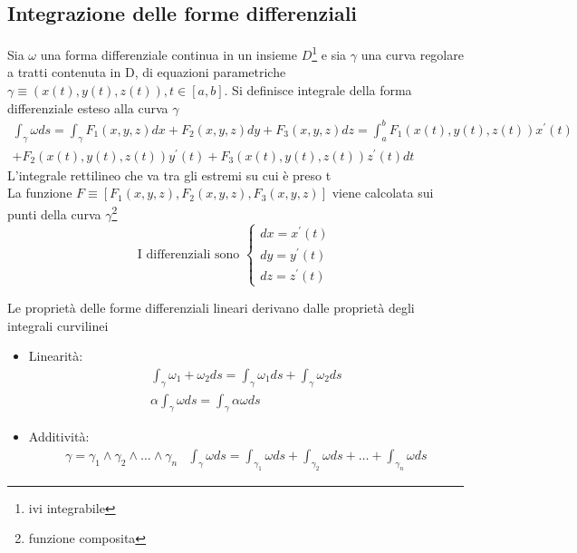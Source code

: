 \subsection{Integrazione delle forme differenziali}
\begin{defi}
	Sia $\omega$ una forma differenziale continua in un insieme
	$D$\footnote{ivi integrabile} e sia $\gamma$ una curva regolare a tratti
	contenuta in D, di equazioni parametriche $\gamma \equiv (x(t),y(t), z(t)),
	t\in [a,b]$. Si definisce {\color{red}integrale della forma differenziale
	esteso alla curva $\gamma$}
	\begin{eqnarray*}
		\int_{\gamma} \omega ds=\int_{\gamma}
		F_1(x,y,z)dx+F_2(x,y,z)dy+F_3(x,y,z)dz=\int_{a}^{b}
		F_1(x(t),y(t),z(t))x^\prime (t)\\
		+F_2(x(t),y(t),z(t))y^\prime (t) + F_3(x(t),y(t),z(t))z^\prime (t)dt
	\end{eqnarray*}
	L'integrale rettilineo che va tra gli estremi su cui è preso t\\
	La funzione $F\equiv[F_1(x,y,z),F_2(x,y,z),F_3(x,y,z)]$ viene calcolata
	sui punti della curva $\gamma$\footnote{funzione composita}
	\begin{equation*}
		\text{I differenziali sono } \begin{cases}
			dx=x^\prime(t)\\
			dy=y^\prime(t)\\
			dz=z^\prime(t)
		\end{cases}
	\end{equation*}
\end{defi}
Le {\color{red} proprietà delle forme differenziali lineari} derivano dalle
proprietà degli integrali curvilinei
\begin{itemize}
	\item Linearità:
		\begin{eqnarray*}
			\int_{\gamma}\omega_1 +\omega_2 ds=\int_\gamma \omega_1ds
			+\int_\gamma \omega_2 ds\\
			\alpha\int_\gamma \omega ds=\int_\gamma \alpha \omega ds 
		\end{eqnarray*}
	\item Additività:
		\begin{eqnarray*}
			\gamma=\gamma_1\wedge \gamma_2\wedge \dots \wedge \gamma_n &
			\int_\gamma \omega ds =\int_{\gamma_1} \omega ds + \int_{\gamma_2}
			\omega ds + \dots +\int_{\gamma_n} \omega ds
		\end{eqnarray*}
\end{itemize}
